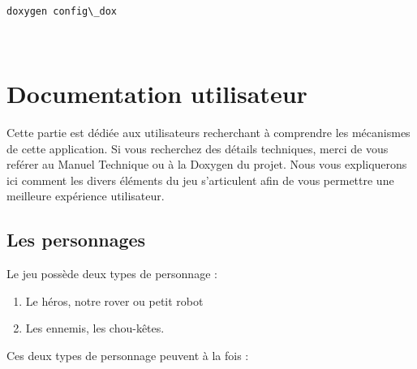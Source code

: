 \documentclass[a4paper 12pts]{article}
\newenvironment{DDbox}[1]{
\begin{lrbox}{\BBbox}\begin{minipage}{\linewidth}}
{\end{minipage}\end{lrbox}\noindent\colorbox{Zgris}{\usebox{\BBbox}} \\
[.5cm]}
\begin{document}
\begin{DDbox}{\linewidth}
\begin{verbatim}

doxygen config\_dox
\end{verbatim}
\end{DDbox}
\vspace{0.3 cm}

\newpage

\section{Documentation utilisateur}


\vspace{2cm}

Cette partie est dédiée aux utilisateurs recherchant à comprendre les mécanismes de cette application.
Si vous recherchez des détails techniques, merci de vous reférer au Manuel Technique ou à la Doxygen du projet.
Nous vous expliquerons ici comment les divers éléments du jeu s'articulent afin de vous permettre une meilleure expérience utilisateur.

\vspace{0.5cm}	

\subsection{Les personnages}

\vspace{1cm}


Le jeu possède deux types de personnage : 

\vspace{0.5cm}

\begin{enumerate}
	\item Le héros, notre rover ou petit robot
	\item Les ennemis, les chou-kêtes.
\end{enumerate}

\vspace{0.5cm}

Ces deux types de personnage peuvent à la fois :

\vspace{0.5cm}
\end{document}

